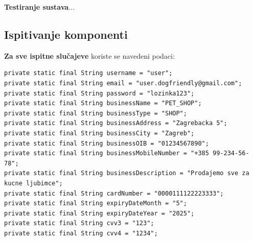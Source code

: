          
         \textbf{Testiranje sustava}{...}
			
			
	
			
			\subsection{Ispitivanje komponenti}
            \textbf{Za sve ispitne slučajeve}{ koriste se navedeni podaci:}
           \begin{lstlisting}
private static final String username = "user";
private static final String email = "user.dogfriendly@gmail.com";
private static final String password = "lozinka123";
private static final String businessName = "PET_SHOP";
private static final String businessType = "SHOP";
private static final String businessAddress = "Zagrebacka 5";
private static final String businessCity = "Zagreb";
private static final String businessOIB = "01234567890";
private static final String businessMobileNumber = "+385 99-234-56-78";
private static final String businessDescription = "Prodajemo sve za kucne ljubimce";
private static final String cardNumber = "0000111122223333";
private static final String expiryDateMonth = "5";
private static final String expiryDateYear = "2025";
private static final String cvv3 = "123";
private static final String cvv4 = "1234";
        \end{lstlisting}
   
